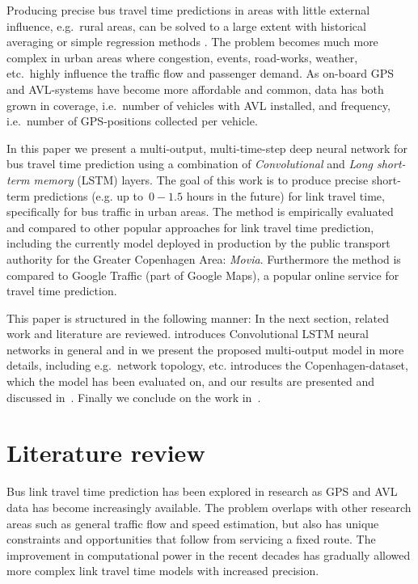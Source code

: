 ﻿\documentclass[preprint,11pt,5p,twocolumn]{elsarticle}
\begin{document}
Producing precise bus travel time predictions in areas with little external influence, e.g.\ rural areas, can be solved to a large extent with historical averaging or simple regression methods \cite{Williams2003,Altinkaya2013}. The problem becomes much more complex in urban areas where congestion, events, road-works, weather, etc.\ highly influence the traffic flow and passenger demand. As on-board GPS and AVL-systems have become more affordable and common, data has both grown in coverage, i.e.\ number of vehicles with AVL installed, and frequency, i.e.\ number of GPS-positions collected per vehicle.

In this paper we present a multi-output, multi-time-step deep neural network for bus travel time prediction using a combination of \emph{Convolutional} and \emph{Long short-term memory} (LSTM) \cite{Lstm1,Lstm2} layers. The goal of this work is to produce precise short-term predictions (e.g. up to\ $0-1.5$ hours in the future) for link travel time, specifically for bus traffic in urban areas. The method is empirically evaluated and compared to other popular approaches for link travel time prediction, including the currently model deployed in production by the public transport authority for the Greater Copenhagen Area: \emph{Movia}. Furthermore the method is compared to Google Traffic (part of Google Maps), a popular online service for travel time prediction. 

This paper is structured in the following manner: In the next section, related work and literature are reviewed.  introduces Convolutional LSTM neural networks in general and in  we present the proposed multi-output model in more details, including e.g.\ network topology, etc.  introduces the Copenhagen-dataset, which the model has been evaluated on, and our results are presented and discussed in~. Finally we conclude on the work in~.

\section{Literature review}
Bus link travel time prediction has been explored in research as GPS and AVL data has become increasingly available. The problem overlaps with other research areas such as general traffic flow and speed estimation, but also has unique constraints and opportunities that follow from servicing a fixed route. The improvement in computational power in the recent decades has gradually allowed more complex link travel time models with increased precision.
\end{document}
